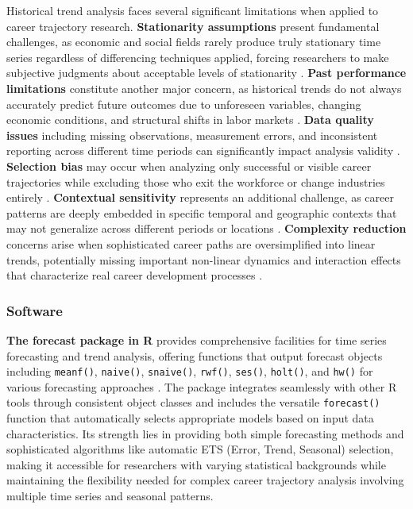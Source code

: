 \documentclass[../main.tex]{subfiles}
\begin{document}
Historical trend analysis faces several significant limitations when applied to career trajectory research. \textbf{Stationarity assumptions} present fundamental challenges, as economic and social fields rarely produce truly stationary time series regardless of differencing techniques applied, forcing researchers to make subjective judgments about acceptable levels of stationarity \citep{wikipedia2005}. \textbf{Past performance limitations} constitute another major concern, as historical trends do not always accurately predict future outcomes due to unforeseen variables, changing economic conditions, and structural shifts in labor markets \citep{netsuite2023}. \textbf{Data quality issues} including missing observations, measurement errors, and inconsistent reporting across different time periods can significantly impact analysis validity \citep{shamrck2023}. \textbf{Selection bias} may occur when analyzing only successful or visible career trajectories while excluding those who exit the workforce or change industries entirely \citep{nature2023}. \textbf{Contextual sensitivity} represents an additional challenge, as career patterns are deeply embedded in specific temporal and geographic contexts that may not generalize across different periods or locations \citep{haas2006}. \textbf{Complexity reduction} concerns arise when sophisticated career paths are oversimplified into linear trends, potentially missing important non-linear dynamics and interaction effects that characterize real career development processes \citep{wang2021}.

\subsubsection{Software}

\textbf{The forecast package in R} provides comprehensive facilities for time series forecasting and trend analysis, offering functions that output forecast objects including \texttt{meanf()}, \texttt{naive()}, \texttt{snaive()}, \texttt{rwf()}, \texttt{ses()}, \texttt{holt()}, and \texttt{hw()} for various forecasting approaches \citep{otexts2023}. The package integrates seamlessly with other R tools through consistent object classes and includes the versatile \texttt{forecast()} function that automatically selects appropriate models based on input data characteristics. Its strength lies in providing both simple forecasting methods and sophisticated algorithms like automatic ETS (Error, Trend, Seasonal) selection, making it accessible for researchers with varying statistical backgrounds while maintaining the flexibility needed for complex career trajectory analysis involving multiple time series and seasonal patterns.
\end{document}
